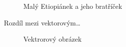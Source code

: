 \documentclass[hidelinks, 11pt, a4paper]{article}[24.03.2023]
\begin{document}
\begin{figure}[!ht]
            \hspace*{\fill}
            \caption{Malý Etiopiánek a jeho bratříček}\label{Obr1}
    \end{figure}

	\pagebreak
    Rozdíl mezi vektorovým\dots
    \begin{figure}[!ht]
        \hfill{}\hspace*{\fill}
        \caption{Vektrorový obrázek}\label{Obr2}
    \end{figure}
\end{document}
